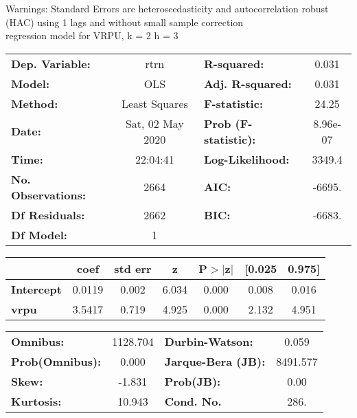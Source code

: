 Warnings: \newline
 [1] Standard Errors are heteroscedasticity and autocorrelation robust (HAC) using 1 lags and without small sample correction\\ 

regression model for VRPU, k = 2 h = 3\begin{center}
\begin{tabular}{lclc}
\toprule
\textbf{Dep. Variable:}    &       rtrn       & \textbf{  R-squared:         } &     0.031   \\
\textbf{Model:}            &       OLS        & \textbf{  Adj. R-squared:    } &     0.031   \\
\textbf{Method:}           &  Least Squares   & \textbf{  F-statistic:       } &     24.25   \\
\textbf{Date:}             & Sat, 02 May 2020 & \textbf{  Prob (F-statistic):} &  8.96e-07   \\
\textbf{Time:}             &     22:04:41     & \textbf{  Log-Likelihood:    } &    3349.4   \\
\textbf{No. Observations:} &        2664      & \textbf{  AIC:               } &    -6695.   \\
\textbf{Df Residuals:}     &        2662      & \textbf{  BIC:               } &    -6683.   \\
\textbf{Df Model:}         &           1      & \textbf{                     } &             \\
\bottomrule
\end{tabular}
\begin{tabular}{lcccccc}
                   & \textbf{coef} & \textbf{std err} & \textbf{z} & \textbf{P$> |$z$|$} & \textbf{[0.025} & \textbf{0.975]}  \\
\midrule
\textbf{Intercept} &       0.0119  &        0.002     &     6.034  &         0.000        &        0.008    &        0.016     \\
\textbf{vrpu}      &       3.5417  &        0.719     &     4.925  &         0.000        &        2.132    &        4.951     \\
\bottomrule
\end{tabular}
\begin{tabular}{lclc}
\textbf{Omnibus:}       & 1128.704 & \textbf{  Durbin-Watson:     } &    0.059  \\
\textbf{Prob(Omnibus):} &   0.000  & \textbf{  Jarque-Bera (JB):  } & 8491.577  \\
\textbf{Skew:}          &  -1.831  & \textbf{  Prob(JB):          } &     0.00  \\
\textbf{Kurtosis:}      &  10.943  & \textbf{  Cond. No.          } &     286.  \\
\bottomrule
\end{tabular}
\end{center}

